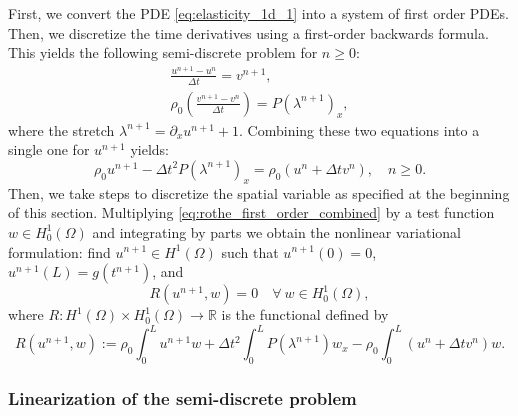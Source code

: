 \documentclass{sfuthesis}
\numberwithin{equation}{section}
\numberwithin{figure}{chapter}
\numberwithin{table}{chapter}
\theoremstyle{definition}
\newcommand{\R}{\mathbb{R}}
\begin{document}
First, we convert the PDE \eqref{eq:elasticity_1d_1} into a system of first order PDEs. Then, we discretize the time derivatives using a first-order backwards formula. This yields the following semi-discrete problem for $n \geq 0$:
\begin{subequations} \label{eq:rothe_first_order}
    \begin{gather}
        \label{eq:disc_u} \frac{u^{n+1}-u^n}{\Delta t} = v^{n+1}, \\
	    \label{eq:disc_v} \rho_0 \left( \frac{v^{n+1}-v^n}{\Delta t} \right) = 
        P(\lambda^{n+1})_x,
    \end{gather}
\end{subequations}
where the stretch $\lambda^{n+1} = \partial_x u^{n+1} + 1$. Combining these two equations into a single one for $u^{n+1}$ yields:
\begin{equation} \label{eq:rothe_first_order_combined}
	\rho_0 u^{n+1} - \Delta t^2 P(\lambda^{n+1})_x = \rho_0 (u^n + \Delta t v^n), \quad n \geq 0.
\end{equation}
Then, we take steps to discretize the spatial variable as specified at the beginning of this section. Multiplying \eqref{eq:rothe_first_order_combined} by a test function $w \in H_0^1(\Omega)$ and integrating by parts we obtain the nonlinear variational formulation: find $u^{n+1} \in  H^1(\Omega)$ such that $u^{n+1}(0) = 0$, $u^{n+1}(L) = g(t^{n+1})$, and
\begin{equation} \label{eq:rothe_first_order_VF}
	R(u^{n+1}, w) = 0 \quad \forall \ w \in H_0^1(\Omega),
\end{equation}
where $R:H^1(\Omega) \times H_0^1(\Omega) \to \R$ is the functional defined by
\begin{equation}
    R(u^{n+1},w) := \rho_0 \int_0^L u^{n+1} w + \Delta t^2 \int_0^L P(\lambda^{n+1}) w_x - \rho_0 \int_0^L (u^n + \Delta t v^n) w.
\end{equation}

\subsubsection*{Linearization of the semi-discrete problem}
\end{document}
